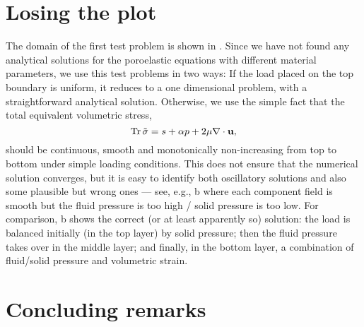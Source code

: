 \section{Losing the plot}

The domain of the first test problem is shown in .
Since we have not found any analytical solutions for the poroelastic equations
with different material parameters, we use this test problems in two ways: If
the load placed on the top boundary is uniform, it reduces to a one dimensional
problem, with a straightforward analytical solution.
Otherwise, we use the simple fact that the total equivalent volumetric stress,
\begin{equation}
\trace{\tilde{\sigma}} = s + \alpha p + 2\mu \nabla\cdot\U,
\end{equation}
should be continuous, smooth and monotonically non-increasing from top to bottom
under simple loading conditions.
This does not ensure that the numerical solution converges, but it is easy to
identify both oscillatory solutions and also some plausible but wrong ones
--- see, e.g., b where each component field is smooth
but the fluid pressure is too high / solid pressure is too low.
For comparison, b shows the correct (or at least
apparently so) solution: the load is balanced initially (in the top layer) by
solid pressure; then the fluid pressure takes over in the middle layer; and
finally, in the bottom layer, a combination of fluid/solid pressure and
volumetric strain.




\section*{Concluding remarks}



\acks






